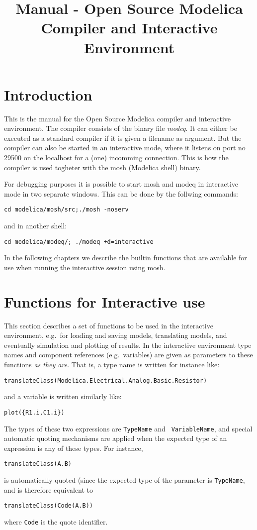 \documentclass{report}
\title{Manual - Open Source Modelica Compiler and Interactive Environment}
\begin{document}
\maketitle
\chapter{Introduction}
This is the manual for the Open Source Modelica compiler and
interactive environment. The compiler consists of the binary file
\emph{modeq}. It can either be executed as a standard compiler if it
is given a filename as argument. But the compiler can also be started
in an interactive mode, where it listens on port no 29500 on the
localhost for a (one) incomming connection. This is how the compiler
is used togheter with the mosh (Modelica shell) binary.

For debugging purposes it is possible to start mosh and modeq in
interactive mode in two separate windows. This can be done by the
follwing commands:
\begin{verbatim}
cd modelica/mosh/src;./mosh -noserv
\end{verbatim}
and in another shell:
\begin{verbatim}
cd modelica/modeq/; ./modeq +d=interactive 
\end{verbatim}

In the following chapters we describe the builtin functions that are
available for use when running the interactive session using mosh.

\chapter{Functions for Interactive use}
This section describes a set of functions to be used in the
interactive environment, e.g.\ for loading and saving models,
translating models, and eventually simulation and plotting of results.
In the interactive environment type names and component references
(e.g.\ variables) are given as parameters to these functions \emph{as
they are}. That is, a type name is written for instance like:
\begin{verbatim}
translateClass(Modelica.Electrical.Analog.Basic.Resistor)
\end{verbatim}
and a variable is written similarly like:
\begin{verbatim}
plot({R1.i,C1.i})
\end{verbatim}
The types of these two expressions are {\tt TypeName} and {\tt
VariableName}, and special automatic quoting mechanisms are applied
when the expected type of an expression is any of these types.
For instance,
\begin{verbatim}
translateClass(A.B)
\end{verbatim}
is automatically quoted (since the expected type of the parameter is
{\tt TypeName}, and is therefore equivalent to
\begin{verbatim}
translateClass(Code(A.B))
\end{verbatim}
where {\tt Code} is the quote identifier.
\end{document}
